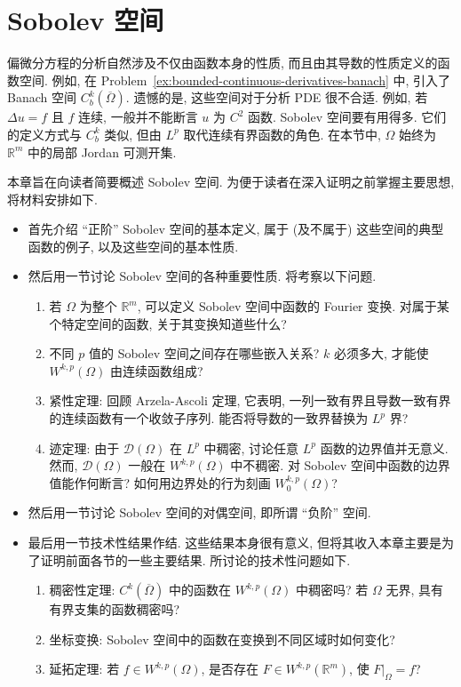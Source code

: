 \section{Sobolev 空间}\label{chap:sobolev-spaces}

偏微分方程的分析自然涉及不仅由函数本身的性质, 而且由其导数的性质定义的函数空间. 例如, 在 Problem~\ref{ex:bounded-continuous-derivatives-banach} 中, 引入了 Banach 空间 $C_b^k(\overline\Omega)$. 遗憾的是, 这些空间对于分析 PDE 很不合适. 例如, 若 $\Delta u=f$ 且 $f$ 连续, 一般并不能断言 $u$ 为 $C^2$ 函数. Sobolev 空间要有用得多. 它们的定义方式与 $C_b^k$ 类似, 但由 $L^p$ 取代连续有界函数的角色. 在本节中, $\Omega$ 始终为 $\mathbb{R}^m$ 中的局部 Jordan 可测开集.

本章旨在向读者简要概述 Sobolev 空间. 为便于读者在深入证明之前掌握主要思想, 将材料安排如下.

\begin{itemize}
\item 首先介绍 ``正阶'' Sobolev 空间的基本定义, 属于 (及不属于) 这些空间的典型函数的例子, 以及这些空间的基本性质.
\item 然后用一节讨论 Sobolev 空间的各种重要性质. 将考察以下问题.
\begin{enumerate}
\item 若 $\Omega$ 为整个 $\mathbb{R}^m$, 可以定义 Sobolev 空间中函数的 Fourier 变换. 对属于某个特定空间的函数, 关于其变换知道些什么?
\item 不同 $p$ 值的 Sobolev 空间之间存在哪些嵌入关系? $k$ 必须多大, 才能使 $W^{k,p}(\Omega)$ 由连续函数组成?
\item 紧性定理: 回顾 Arzela-Ascoli 定理, 它表明, 一列一致有界且导数一致有界的连续函数有一个收敛子序列. 能否将导数的一致界替换为 $L^p$ 界?
\item 迹定理: 由于 $\mathcal{D}(\Omega)$ 在 $L^p$ 中稠密, 讨论任意 $L^p$ 函数的边界值并无意义. 然而, $\mathcal{D}(\Omega)$ 一般在 $W^{k,p}(\Omega)$ 中不稠密. 对 Sobolev 空间中函数的边界值能作何断言? 如何用边界处的行为刻画 $W_0^{k,p}(\Omega)$?
\end{enumerate}
\item 然后用一节讨论 Sobolev 空间的对偶空间, 即所谓 ``负阶'' 空间.
\item 最后用一节技术性结果作结. 这些结果本身很有意义, 但将其收入本章主要是为了证明前面各节的一些主要结果. 所讨论的技术性问题如下.
\begin{enumerate}
\item 稠密性定理: $C^k(\overline\Omega)$ 中的函数在 $W^{k,p}(\Omega)$ 中稠密吗? 若 $\Omega$ 无界, 具有有界支集的函数稠密吗?
\item 坐标变换: Sobolev 空间中的函数在变换到不同区域时如何变化?
\item 延拓定理: 若 $f\in W^{k,p}(\Omega)$, 是否存在 $F\in W^{k,p}(\mathbb{R}^m)$, 使 $F|_{\Omega}=f$?
\end{enumerate}
\end{itemize}

